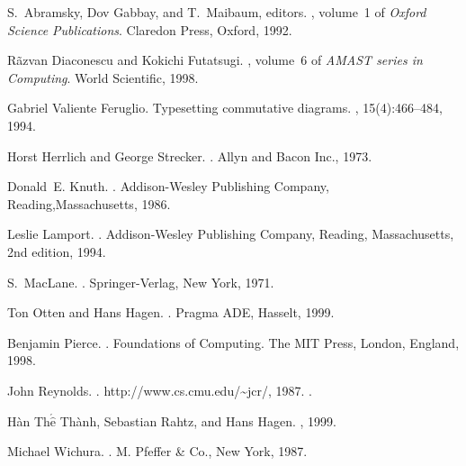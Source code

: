 \documentclass{europroc}
\begin{document}
%

%

\newcommand{\noopsort}[1]{} \newcommand{\singleletter}[1]{#1}
\begin{thebibliography}{10}

S.~Abramsky, Dov Gabbay, and T.~Maibaum, editors.
, volume~1 of {\em Oxford
  Science Publications}.
\newblock Claredon Press, Oxford, 1992.

R{\~a}zvan Diaconescu and Kokichi Futatsugi.
, volume~6 of {\em
  AMAST series in Computing}.
\newblock World Scientific, 1998.

{Gabriel Valiente} Feruglio.
\newblock Typesetting commutative diagrams.
, 15(4):466--484, 1994.

Horst Herrlich and George Strecker.
.
\newblock Allyn and Bacon Inc., 1973.

Donald~E. Knuth.
.
\newblock Addison-Wesley Publishing Company, Reading,Massachusetts, 1986.

Leslie Lamport.
.
\newblock Addison-Wesley Publishing Company, Reading, Massachusetts, 2nd
  edition, 1994.

S.~MacLane.
.
\newblock Springer-Verlag, New York, 1971.

Ton Otten and Hans Hagen.
.
\newblock Pragma ADE, Hasselt, 1999.

Benjamin Pierce.
.
\newblock Foundations of Computing. The MIT Press, London, England, 1998.

John Reynolds.
.
\newblock http://www.cs.cmu.edu/{\~{}}jcr/, 1987.
.

{H\`{a}n Th{$\acute{\hat{\mathrm e}}$}} Th\`{a}nh, Sebastian Rahtz, and Hans
  Hagen.
, 1999.

Michael Wichura.
.
\newblock M. Pfeffer \& Co., New York, 1987.

\end{thebibliography}
\end{document}
